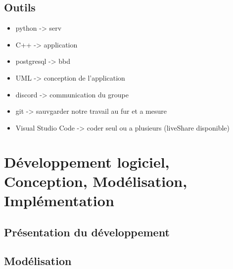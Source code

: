 \documentclass{report}
\begin{document}
\section{Outils} %
\begin{itemize}
    \item python -> serv
    \item C++ -> application
    \item postgresql -> bbd
    \item UML -> conception de l'application
    \item discord -> communication du groupe
    \item git -> sauvgarder notre travail au fur et a mesure
    \item Visual Studio Code -> coder seul ou a plusieurs (liveShare disponible)
\end{itemize}

\chapter{Développement logiciel, Conception, Modélisation, Implémentation}
\section{Présentation du développement}

\section{Modélisation} %
\end{document}
